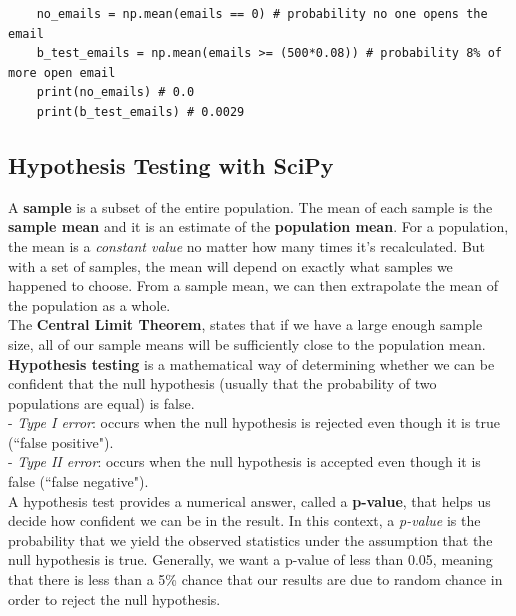 \documentclass[11pt, a4paper]{article}
\begin{document}
\begin{spacing}{1.1}
\begin{lstlisting}
	no_emails = np.mean(emails == 0) # probability no one opens the email
	b_test_emails = np.mean(emails >= (500*0.08)) # probability 8% of more open email
	print(no_emails) # 0.0
	print(b_test_emails) # 0.0029 \end{lstlisting}\vspace*{4mm}
	
	\subsection{Hypothesis Testing with SciPy}
	A \textbf{sample} is a subset of the entire population. The mean of each sample is the \textbf{sample mean} and it is an estimate of the \textbf{population mean}. For a population, the mean is a \textit{constant value} no matter how many times it’s recalculated. But with a set of samples, the mean will depend on exactly what samples we happened to choose. From a sample mean, we can then extrapolate the mean of the population as a whole. \vspace*{1mm} \\
	The \textbf{Central Limit Theorem}, states that if we have a large enough sample size, all of our sample means will be sufficiently close to the population mean. \vspace*{1mm} \\
	\textbf{Hypothesis testing} is a mathematical way of determining whether we can be confident that the null hypothesis (usually that the probability of two populations are equal) is false. \\
	\hspace*{3mm} - \textit{Type I error}: occurs when the null hypothesis is rejected even though it is true (``false positive"). \\
	\hspace*{3mm} - \textit{Type II error}: occurs when the null hypothesis is accepted even though it is false (``false negative"). \vspace*{.2mm} \\
	A hypothesis test provides a numerical answer, called a \textbf{p-value}, that helps us decide how confident we can be in the result. In this context, a \textit{p-value} is the probability that we yield the observed statistics under the assumption that the null hypothesis is true. Generally, we want a p-value of less than 0.05, meaning that there is less than a 5\% chance that our results are due to random chance in order to reject the null hypothesis. \newpage


\end{spacing}
\end{document}
